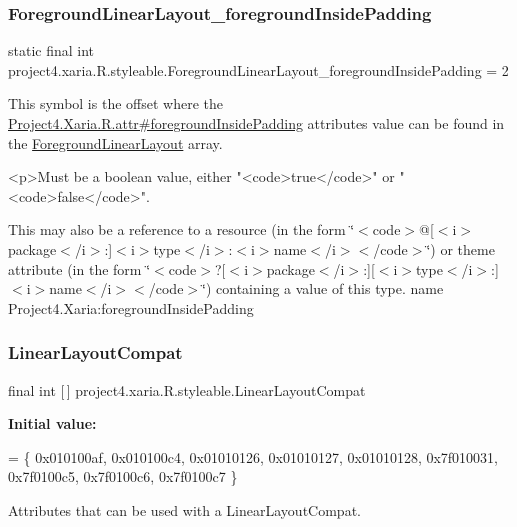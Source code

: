 \subsubsection{\texorpdfstring{Foreground\+Linear\+Layout\+\_\+foreground\+Inside\+Padding}{ForegroundLinearLayout\_foregroundInsidePadding}}
{\footnotesize\ttfamily static final int project4.\+xaria.\+R.\+styleable.\+Foreground\+Linear\+Layout\+\_\+foreground\+Inside\+Padding = 2\hspace{0.3cm}{\ttfamily [static]}}

This symbol is the offset where the \hyperlink{}{Project4.\+Xaria.\+R.\+attr\#foreground\+Inside\+Padding} attribute\textquotesingle{}s value can be found in the \hyperlink{classproject4_1_1xaria_1_1R_1_1styleable_a32963533d4ea1b671544e3c531ad5f97}{Foreground\+Linear\+Layout} array.

\begin{DoxyVerb}      <p>Must be a boolean value, either "<code>true</code>" or "<code>false</code>".
\end{DoxyVerb}
 

This may also be a reference to a resource (in the form \char`\"{}$<$code$>$@\mbox{[}$<$i$>$package$<$/i$>$\+:\mbox{]}$<$i$>$type$<$/i$>$\+:$<$i$>$name$<$/i$>$$<$/code$>$\char`\"{}) or theme attribute (in the form \char`\"{}$<$code$>$?\mbox{[}$<$i$>$package$<$/i$>$\+:\mbox{]}\mbox{[}$<$i$>$type$<$/i$>$\+:\mbox{]}$<$i$>$name$<$/i$>$$<$/code$>$\char`\"{}) containing a value of this type.  name Project4.\+Xaria\+:foreground\+Inside\+Padding \mbox{\label{classproject4_1_1xaria_1_1R_1_1styleable_a7f929bdf7d740d51fa83ce463e56c432}} 
\subsubsection{\texorpdfstring{Linear\+Layout\+Compat}{LinearLayoutCompat}}
{\footnotesize\ttfamily final int \mbox{[}$\,$\mbox{]} project4.\+xaria.\+R.\+styleable.\+Linear\+Layout\+Compat\hspace{0.3cm}{\ttfamily [static]}}

{\bfseries Initial value\+:}
\begin{DoxyCode}
= \{
            0x010100af, 0x010100c4, 0x01010126, 0x01010127,
            0x01010128, 0x7f010031, 0x7f0100c5, 0x7f0100c6,
            0x7f0100c7
        \}
\end{DoxyCode}
Attributes that can be used with a Linear\+Layout\+Compat. 


